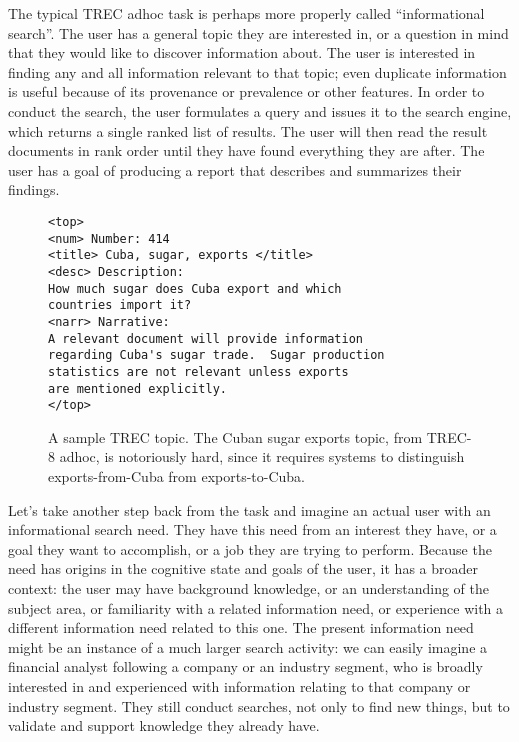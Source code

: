 \documentclass[nobib]{tufte-book}
\begin{document}
The typical TREC adhoc task is perhaps more properly called ``informational search''.  The user has a general topic they are interested in, or a question in mind that they would like to discover information about.  The user is interested in finding any and all information relevant to that topic; even duplicate information is useful because of its provenance or prevalence or other features.  In order to conduct the search, the user formulates a query and issues it to the search engine, which returns a single ranked list of results.  The user will then read the result documents in rank order until they have found everything they are after.  The user has a goal of producing a report that describes and summarizes their findings.

\begin{figure}
    \centering
    \begin{lstlisting}
<top>
<num> Number: 414
<title> Cuba, sugar, exports </title>
<desc> Description:
How much sugar does Cuba export and which
countries import it?
<narr> Narrative:
A relevant document will provide information
regarding Cuba's sugar trade.  Sugar production
statistics are not relevant unless exports
are mentioned explicitly.
</top>
    \end{lstlisting}
    \caption{A sample TREC topic.  The Cuban sugar exports topic, from TREC-8 adhoc, is notoriously hard, since it requires systems to distinguish exports-from-Cuba from exports-to-Cuba.}
    \label{fig:cuba-sugar-topic}
\end{figure}

Let's take another step back from the task and imagine an actual user with an informational search need.  They have this need from an interest they have, or a goal they want to accomplish, or a job they are trying to perform.  Because the need has origins in the cognitive state and goals of the user, it has a broader context: the user may have background knowledge, or an understanding of the subject area, or familiarity with a related information need, or experience with a different information need related to this one.  The present information need might be an instance of a much larger search activity: we can easily imagine a financial analyst following a company or an industry segment, who is broadly interested in and experienced with information relating to that company or industry segment.  They still conduct searches, not only to find new things, but to validate and support knowledge they already have.
\end{document}
